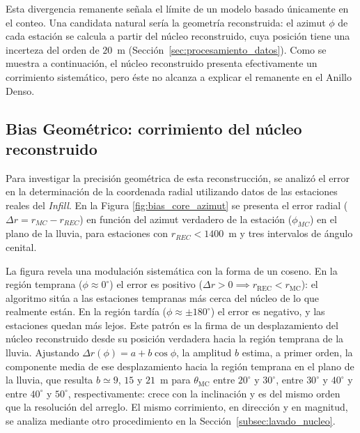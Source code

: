 Esta divergencia remanente señala el límite de un modelo basado únicamente en el conteo. Una candidata natural sería la geometría reconstruida: el azimut $\phi$ de cada estación se calcula a partir del núcleo reconstruido, cuya posición tiene una incerteza del orden de $20$~m (Sección~\ref{sec:procesamiento_datos}). Como se muestra a continuación, el núcleo reconstruido presenta efectivamente un corrimiento sistemático, pero éste no alcanza a explicar el remanente en el Anillo Denso.

\subsection{Bias Geométrico: corrimiento del núcleo reconstruido}
\label{subsubsec:corrimiento_nucleo}

Para investigar la precisión geométrica de esta reconstrucción, se analizó el error en la determinación de la coordenada radial utilizando datos de las estaciones reales del \textit{Infill}. En la Figura \ref{fig:bias_core_azimut} se presenta el error radial ($\Delta r = r_{MC} - r_{REC}$) en función del azimut verdadero de la estación ($\phi_{MC}$) en el plano de la lluvia, para estaciones con $r_{REC} < 1400$~m y tres intervalos de ángulo cenital.

La figura revela una modulación sistemática con la forma de un coseno. En la región temprana ($\phi \approx 0^\circ$) el error es positivo ($\Delta r > 0 \implies r_{\mathrm{REC}} < r_{\mathrm{MC}}$): el algoritmo sitúa a las estaciones tempranas más cerca del núcleo de lo que realmente están. En la región tardía ($\phi \approx \pm 180^\circ$) el error es negativo, y las estaciones quedan más lejos. Este patrón es la firma de un desplazamiento del núcleo reconstruido desde su posición verdadera hacia la región temprana de la lluvia. Ajustando $\Delta r(\phi) = a + b\cos\phi$, la amplitud $b$ estima, a primer orden, la componente media de ese desplazamiento hacia la región temprana en el plano de la lluvia, que resulta $b \simeq 9$, $15$ y $21$~m para $\theta_{\mathrm{MC}}$ entre $20^\circ$ y $30^\circ$, entre $30^\circ$ y $40^\circ$ y entre $40^\circ$ y $50^\circ$, respectivamente: crece con la inclinación y es del mismo orden que la resolución del arreglo. El mismo corrimiento, en dirección y en magnitud, se analiza mediante otro procedimiento en la Sección~\ref{subsec:lavado_nucleo}.

